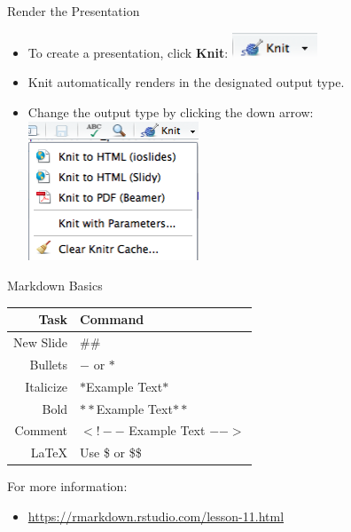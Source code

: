 \documentclass{beamer}
\begin{document}
\begin{frame}{Render the Presentation}
\begin{itemize}
    \item To create a presentation, click \textbf{Knit}: \includegraphics[width=1in]{RMarkdown/4.png}
    \item Knit automatically renders in the designated output type.
    \item Change the output type by clicking the down arrow:\\
\centering \includegraphics[width=2in]{RMarkdown/3.png}
\end{itemize}
\end{frame}

\begin{frame}{Markdown Basics}
\begin{table} \centering
    \begin{tabular}{r|l} \hline
    \textbf{Task} & \textbf{Command} \\ \hline
         New Slide & \#\#\\
         Bullets & $-$ or $*$ \\
         Italicize & $*$Example Text$*$ \\
         Bold & $**$Example Text$**$ \\
         Comment & $<!--$ Example Text $-->$\\ 
         \LaTeX & Use \$ or \$\$ \\ \hline
    \end{tabular}
\end{table}

For more information:
\begin{itemize}
    \item \url{https://rmarkdown.rstudio.com/lesson-11.html}
\end{itemize}

\end{frame}
\end{document}
